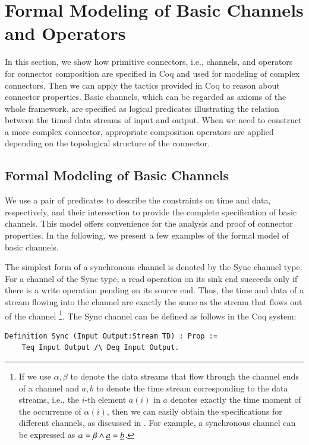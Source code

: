 \documentclass[3p,times]{elsarticle}
\begin{document}
\section{Formal Modeling of Basic Channels and Operators}\label{sec:channelandoperator}
In this section, we show how primitive connectors, i.e., channels, and operators for connector composition are specified in Coq and used for modeling of complex connectors. Then we can apply the tactics provided in Coq to reason about connector properties. Basic channels, which can be regarded as axioms of the whole framework, are specified as logical predicates illustrating the relation between the timed data streams of input and output. When we need to construct a more complex connector, appropriate composition operators are applied depending on the topological structure of the connector.

\subsection{Formal Modeling of Basic Channels}

We use a pair of predicates to describe the constraints on time and data, respectively, and their intersection to provide the complete specification of basic channels. This model offers convenience for the analysis and proof of connector properties. In the following, we present a few examples of the formal model of basic channels.

The simplest form of a synchronous channel is denoted by the Sync channel type. For a channel of the Sync type, a read operation on
its sink end succeeds only if there is a write operation pending on its source end. Thus, the time and data of a stream flowing
into the channel are exactly the same as the stream that flows out of the channel
\footnote{If we use $\alpha,\beta$ to denote the data streams that flow through the channel ends of a channel and $a,b$ to denote the time stream corresponding to the data streams, i.e., the $i$-th element $a(i)$ in $a$ denotes exactly the time moment of the occurrence of $\alpha(i)$, then we can easily obtain the specifications for different channels, as discussed in \cite{Sun12,SAA+12}. For example, a synchronous channel can be expressed as $\alpha=\beta \wedge \emph{a}=\emph{b}$.}.
The Sync channel can be defined as follows in the Coq system:
\begin{lstlisting}[language=coq]
    Definition Sync (Input Output:Stream TD) : Prop :=
    Teq Input Output /\ Deq Input Output.
\end{lstlisting}
\end{document}
